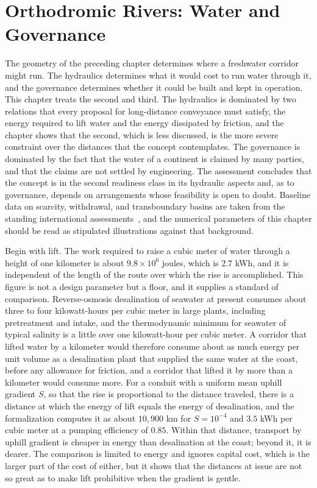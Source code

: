 \chapter{Orthodromic Rivers: Water and Governance}
\label{ch:18}

The geometry of the preceding chapter determines where a freshwater corridor might run. The hydraulics determines what it would cost to run water through it, and the governance determines whether it could be built and kept in operation. This chapter treats the second and third. The hydraulics is dominated by two relations that every proposal for long-distance conveyance must satisfy, the energy required to lift water and the energy dissipated by friction, and the chapter shows that the second, which is less discussed, is the more severe constraint over the distances that the concept contemplates. The governance is dominated by the fact that the water of a continent is claimed by many parties, and that the claims are not settled by engineering. The assessment concludes that the concept is in the second readiness class in its hydraulic aspects and, as to governance, depends on arrangements whose feasibility is open to doubt. Baseline data on scarcity, withdrawal, and transboundary basins are taken from the standing international assessments~\cite{unesco2024,fao2024}, and the numerical parameters of this chapter should be read as stipulated illustrations against that background.

Begin with lift. The work required to raise a cubic meter of water through a height of one kilometer is about $9.8\times10^{6}$ joules, which is $2.7$ kWh, and it is independent of the length of the route over which the rise is accomplished. This figure is not a design parameter but a floor, and it supplies a standard of comparison. Reverse-osmosis desalination of seawater at present consumes about three to four kilowatt-hours per cubic meter in large plants, including pretreatment and intake, and the thermodynamic minimum for seawater of typical salinity is a little over one kilowatt-hour per cubic meter. A corridor that lifted water by a kilometer would therefore consume about as much energy per unit volume as a desalination plant that supplied the same water at the coast, before any allowance for friction, and a corridor that lifted it by more than a kilometer would consume more. For a conduit with a uniform mean uphill gradient $S$, so that the rise is proportional to the distance traveled, there is a distance at which the energy of lift equals the energy of desalination, and the formalization computes it as about $10{,}900$ km for $S=10^{-4}$ and $3.5$ kWh per cubic meter at a pumping efficiency of $0.85$. Within that distance, transport by uphill gradient is cheaper in energy than desalination at the coast; beyond it, it is dearer. The comparison is limited to energy and ignores capital cost, which is the larger part of the cost of either, but it shows that the distances at issue are not so great as to make lift prohibitive when the gradient is gentle.

